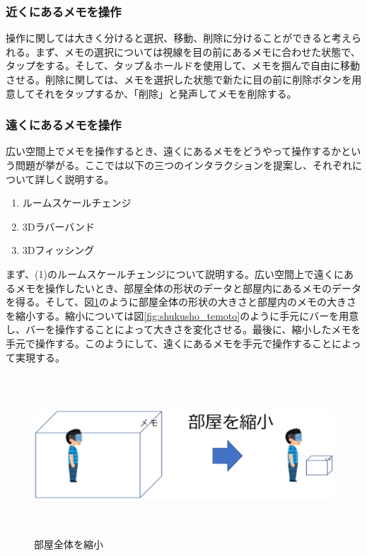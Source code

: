 \documentclass[11pt,a4j, titlepage]{jarticle} %
\begin{document}
\subsubsection{近くにあるメモを操作}
操作に関しては大きく分けると選択、移動、削除に分けることができると考えられる。まず、メモの選択については視線を目の前にあるメモに合わせた状態で、タップをする。そして、タップ＆ホールドを使用して、メモを掴んで自由に移動させる。削除に関しては、メモを選択した状態で新たに目の前に削除ボタンを用意してそれをタップするか、「削除」と発声してメモを削除する。

\subsubsection{遠くにあるメモを操作}
広い空間上でメモを操作するとき、遠くにあるメモをどうやって操作するかという問題が挙がる。ここでは以下の三つのインタラクションを提案し、それぞれについて詳しく説明する。

\begin{enumerate}[(1)]
 \item ルームスケールチェンジ
 \item 3Dラバーバンド
 \item 3Dフィッシング
\end{enumerate}

まず、(1)のルームスケールチェンジについて説明する。広い空間上で遠くにあるメモを操作したいとき、部屋全体の形状のデータと部屋内にあるメモのデータを得る。そして、図\ref{fig:room_shukusho}のように部屋全体の形状の大きさと部屋内のメモの大きさを縮小する。縮小については図\ref{fig:shukusho_temoto}のように手元にバーを用意し、バーを操作することによって大きさを変化させる。最後に、縮小したメモを手元で操作する。このようにして、遠くにあるメモを手元で操作することによって実現する。

\begin{figure}[H]
  \begin{center}
    \includegraphics[clip,height=6.0cm,width=14.0cm]{./room_shukusho.eps}
    \caption{部屋全体を縮小}
    \label{fig:room_shukusho}
  \end{center}
\end{figure}
\end{document}
